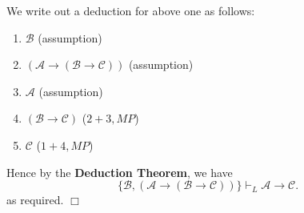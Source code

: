 \documentclass[UTF8,12pt,a4paper]{ctexart}
\begin{document}
We write out a deduction for above one as follows:

\begin{enumerate}
	\item $\mathscr{B}$  
	\hfill (assumption)
	
	\item $(\mathscr{A} \to (\mathscr{B} \to \mathscr{C}))$
	\hfill (assumption)
	
	\item $\mathscr{A}$
	\hfill (assumption)
	
	\item $(\mathscr{B} \to \mathscr{C})$
	\hfill ($2+3,MP$)
	
	\item $\mathscr{C}$
	\hfill ($1+4, MP$)
\end{enumerate} 

Hence by the \textbf{Deduction Theorem}, we have
\[
\{\mathscr{B}, (\mathscr{A} \to (\mathscr{B} \to \mathscr{C}))\} \vdash_L \mathscr{A} \to \mathscr{C}.
\]
as required.
\hfill $\Box$

\vspace{1em}
\end{document}

